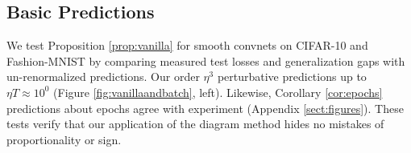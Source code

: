 \documentclass{article}
\theoremstyle{plain}
\theoremstyle{definition}
\begin{document}

    \subsection{Basic Predictions}
        We test Proposition \ref{prop:vanilla} for smooth convnets on CIFAR-10
        and Fashion-MNIST by comparing measured test losses and generalization
        gaps with un-renormalized predictions.  Our order $\eta^3$ perturbative predictions
        up to $\eta T \approx 10^0$ (Figure \ref{fig:vanillaandbatch}, left).
        Likewise, Corollary \ref{cor:epochs} predictions about epochs agree
        with experiment (Appendix \ref{sect:figures}).  These tests verify that
        our application of the diagram method hides no mistakes of
        proportionality or sign.  

 
   
\end{document}
